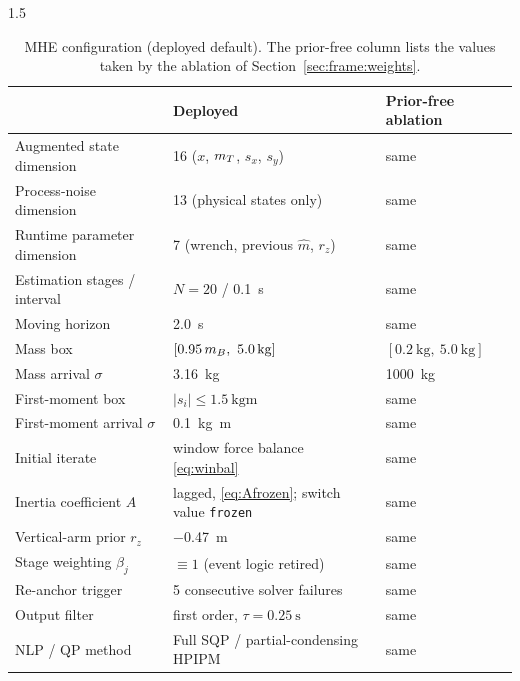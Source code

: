 \begin{appendices}
\begin{spacing}{1.5}
\begin{table}[ht]
\centering
\caption{MHE configuration (deployed default). The prior-free column lists the
values taken by the ablation of Section~\ref{sec:frame:weights}.}
\small
\begin{tabularx}{\textwidth}{@{}p{} X X@{}}
\toprule
 & \textbf{Deployed} & \textbf{Prior-free ablation} \\
\midrule
Augmented state dimension & 16 ($x$, $m_T$, $s_x$, $s_y$) & same \\
Process-noise dimension & 13 (physical states only) & same \\
Runtime parameter dimension & 7 (wrench, previous $\hat m$, $r_z$) & same \\
Estimation stages / interval & $N=20$ / \SI{0.1}{\second} & same \\
Moving horizon & \SI{2.0}{\second} & same \\
Mass box & $[0.95\,\mB,\ \SI{5.0}{\kg}]$ & $[\SI{0.2}{\kg},\ \SI{5.0}{\kg}]$ \\
Mass arrival $\sigma$ & \SI{3.16}{\kg} & \SI{1000}{\kg} \\
First-moment box & $|s_i|\le\SI{1.5}{\kg\meter}$ & same \\
First-moment arrival $\sigma$ & \SI{0.1}{\kg\meter} & same \\
Initial iterate & window force balance \eqref{eq:winbal} & same \\
Inertia coefficient $A$ & lagged, \eqref{eq:Afrozen}; switch value \texttt{frozen} & same \\
Vertical-arm prior $r_z$ & \SI{-0.47}{\meter} & same \\
Stage weighting $\beta_j$ & $\equiv 1$ (event logic retired) & same \\
Re-anchor trigger & 5 consecutive solver failures & same \\
Output filter & first order, $\tau=\SI{0.25}{\second}$ & same \\
NLP / QP method & Full SQP / partial-condensing HPIPM & same \\
\bottomrule
\end{tabularx}
\end{table}


\end{spacing}
\end{appendices}
